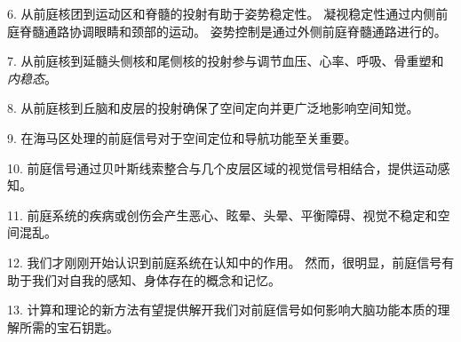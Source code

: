 6. 从前庭核团到运动区和脊髓的投射有助于姿势稳定性。
凝视稳定性通过内侧前庭脊髓通路协调眼睛和颈部的运动。
姿势控制是通过外侧前庭脊髓通路进行的。


7. 从前庭核到延髓头侧核和尾侧核的投射参与调节血压、心率、呼吸、骨重塑和\textit{内稳态}。


8. 从前庭核到丘脑和皮层的投射确保了空间定向并更广泛地影响空间知觉。


9. 在海马区处理的前庭信号对于空间定位和导航功能至关重要。


10. 前庭信号通过贝叶斯线索整合与几个皮层区域的视觉信号相结合，提供运动感知。


11. 前庭系统的疾病或创伤会产生恶心、眩晕、头晕、平衡障碍、视觉不稳定和空间混乱。


12. 我们才刚刚开始认识到前庭系统在认知中的作用。 然而，很明显，前庭信号有助于我们对自我的感知、身体存在的概念和记忆。


13. 计算和理论的新方法有望提供解开我们对前庭信号如何影响大脑功能本质的理解所需的宝石钥匙。




